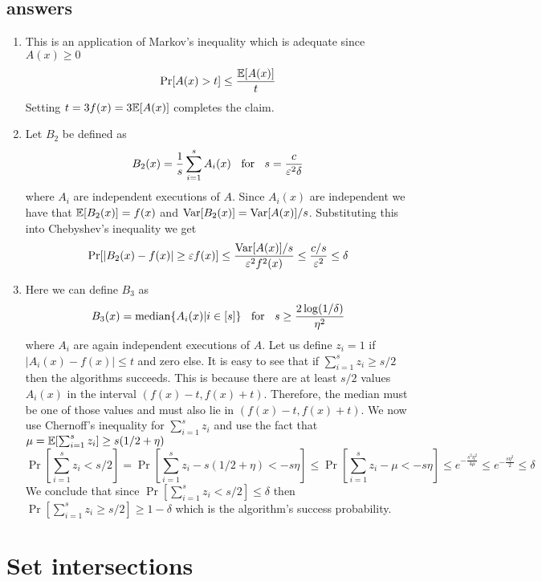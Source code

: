 \documentclass{article}
\begin{document}
\subsection*{answers}
\begin{enumerate}
\item This is an application of Markov's inequality which is adequate since $A(x) \ge 0$
\[
\Pr[A(x) > t] \le \frac{{\mathbb E}[A(x)]}{t}
\]
Setting $t = 3f(x) = 3{\mathbb E}[A(x)]$ completes the claim. 
\item Let $B_2$ be defined as 
\[
B_2(x) = \frac{1}{s}\sum_{i=1}^{s}A_{i}(x) \mbox{\;\; for \;\;} s=\frac{c}{\varepsilon^2\delta}
\]
where $A_{i}$ are independent executions of $A$.
Since $A_{i}(x)$ are independent we have that ${\mathbb E}[B_2(x)] = f(x)$ and ${\operatorname{Var}}[B_2(x)] = {\operatorname{Var}}[A(x)]/s$.
Substituting this into Chebyshev's inequality we get
\[
\Pr[|B_2(x) - f(x)| \ge \varepsilon f(x)] \le \frac{{\operatorname{Var}}[A(x)]/s}{\varepsilon^2 f^2(x)} \le  \frac{c/s}{\varepsilon^2} \le \delta
\] 
\item Here we can define $B_3$ as
\[
B_3(x) = \operatorname{median} \{A_{i}(x) | i \in [s]\} \mbox{\;\; for \;\;} s \ge \frac{2 \log(1/\delta)}{\eta^2}
\]
where $A_{i}$ are again independent executions of $A$.
Let us define $z_i =1$ if $|A_i(x) - f(x) | \le t$ and zero else.
It is easy to see that if $\sum_{i=1}^{s}z_i \ge s/2$ then the algorithms succeeds.
This is because there are at least $s/2$ values $A_i(x)$ in the interval $(f(x)-t,f(x)+t)$. 
Therefore, the median must be one of those values and must also lie in $(f(x)-t,f(x)+t)$. 
We now use Chernoff's inequality for $\sum_{i=1}^{s}z_i$ and use the fact that $\mu = {\mathbb E}[\sum_{i=1}^{s}z_i] \ge s(1/2+\eta)$
\[
\Pr[\sum_{i=1}^{s}z_i < s/2] = \Pr[\sum_{i=1}^{s}z_i - s(1/2+\eta) < -s\eta] \le \Pr[\sum_{i=1}^{s}z_i - \mu < - s\eta] \le e^{-\frac{s^2\eta^2}{4\mu}} \le e^{-\frac{s\eta^2}{2}} \le \delta 
\]
We conclude that since $\Pr[\sum_{i=1}^{s}z_i < s/2] \le \delta$ then $\Pr[\sum_{i=1}^{s}z_i \ge s/2] \ge 1-\delta$ which is the algorithm's success probability.
\end{enumerate}


\pagebreak

\section{Set intersections} 
\end{document}
